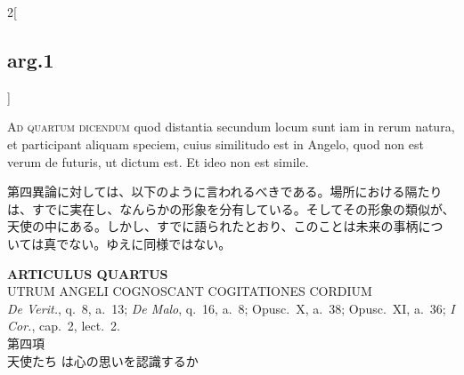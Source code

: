 \documentclass[paper=a4paper,fontsize=10pt,jafontsize=9pt,titlepage]{jlreq}
\begin{document}
\begin{paracol}{2}[\subsection{arg.1}]
\switchcolumn*[\subsection{ad.4}]

{\scshape Ad quartum dicendum} quod distantia secundum locum sunt iam
in rerum natura, et participant aliquam speciem, cuius similitudo est
in Angelo, quod non est verum de futuris, ut dictum est. Et ideo non
est simile.

\switchcolumn

第四異論に対しては、以下のように言われるべきである。場所における隔たり
は、すでに実在し、なんらかの形象を分有している。そしてその形象の類似が、
天使の中にある。しかし、すでに語られたとおり、このことは未来の事柄につ
いては真でない。ゆえに同様ではない。

\end{paracol}
\newpage
{}
{}
\setcounter{section}{4}
\setcounter{subsection}{0}



\begin{center}
{\Large {\bfseries ARTICULUS QUARTUS}}\\ {\large UTRUM ANGELI COGNOSCANT
COGITATIONES CORDIUM}\\ {\footnotesize {\itshape De Verit.}, q.~8,
a.~13; {\itshape De Malo}, q.~16, a.~8; Opusc.~X, a.~38; Opusc.~XI,
a.~36; {\itshape I Cor.}, cap.~2, lect.~2.}\\ {\Large 第四項\\天使たち
は心の思いを認識するか}
\end{center}
\end{document}
